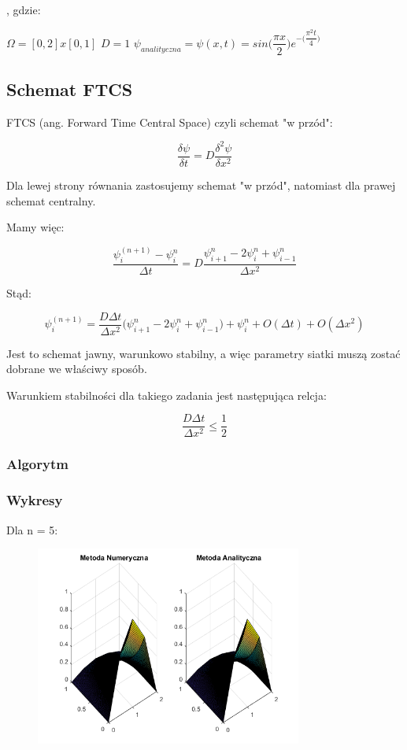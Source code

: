 , gdzie:

$\Omega = [0,2]x[0,1]$
\newline
$D=1$
\newline
\vspace{0.2cm}
$\psi_{analityczna}=\psi(x,t)=sin\Big(\dfrac{\pi x}{2}\Big)e^{-\Big(\dfrac{\pi^2 t}{4}\Big)}$

\subsection{Schemat FTCS}

FTCS (ang. Forward Time Central Space) czyli schemat "w przód":

$$\dfrac{\delta \psi}{\delta t} = D\dfrac{\delta^2 \psi}{\delta x^2}$$

Dla lewej strony równania zastosujemy schemat "w przód", natomiast dla prawej schemat centralny.

Mamy więc:

$$\dfrac{\psi^{(n+1)}_{i}-\psi^n_{i}}{\Delta t}=D\dfrac{\psi^{n}_{i+1}-2\psi^n_{i}+\psi^n_{i-1}}{\Delta x^2}$$

Stąd:

$$\psi^{(n+1)}_{i}=\dfrac{D\Delta t}{\Delta x^2}\Big(\psi^{n}_{i+1}-2\psi^{n}_{i}+\psi^{n}_{i-1}\Big)+\psi^{n}_{i} + O(\Delta t)+O(\Delta x^2)$$

Jest to schemat jawny, warunkowo stabilny, a więc parametry siatki muszą zostać dobrane we właściwy sposób.

Warunkiem stabilności dla takiego zadania jest następująca relcja:

$$\dfrac{D\Delta t}{\Delta x^2}\le \dfrac{1}{2}$$

\subsubsection{Algorytm}


\newpage
\subsubsection{Wykresy}

Dla n = 5:

\begin{figure}[!ht]
	\begin{center}
		\includegraphics[width=0.78\textwidth]{Lab7/charts/ftcs/5.png}
	\end{center}
\end{figure}

